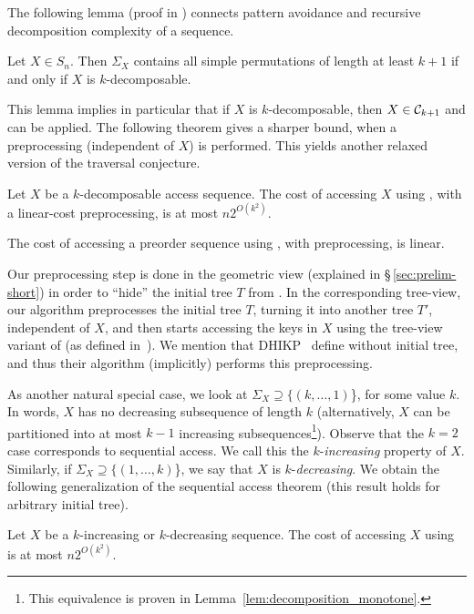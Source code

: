 The following lemma (proof in ) connects pattern avoidance and recursive decomposition complexity of a sequence.

\begin{lemma}
\label{lem:connection}
Let $X \in S_n$. Then $\Sigma_X$ contains all simple permutations of length at least $k+1$ if and only if $X$ is $k$-decomposable. 
\end{lemma}  

This lemma implies in particular that if $X$ is $k$-decomposable, then $X \in {\mathcal{C}}_{k+1}$ and  can be applied. The following theorem gives a sharper bound, when a preprocessing (independent of $X$) is performed. 
This yields another relaxed version of the traversal conjecture. 

\begin{theorem}
\label{thm:main-noinitial}  
Let $X$ be a $k$-decomposable access sequence.  
The cost of accessing $X$ using \greedy, with a linear-cost preprocessing, is at most $n 2^{O(k^2)}$. 
\end{theorem} 

\begin{corollary}
\label{cor:trav2}
The cost of accessing a preorder sequence using \greedy, with preprocessing, is linear. 
\end{corollary}

Our preprocessing step is done in the geometric view (explained in \S\,\ref{sec:prelim-short}) in order to ``hide'' the initial tree $T$ from \greedy. In the corresponding tree-view, our algorithm preprocesses the initial tree $T$, turning it into another tree $T'$, independent of $X$, and then starts accessing the keys in $X$ using the tree-view variant of \greedy (as defined in~\cite{DHIKP09}). We mention that DHIKP~\cite{DHIKP09} define \greedy without initial tree, and thus their algorithm (implicitly) performs this preprocessing.

As another natural special case, we look at $\Sigma_X \supseteq \{(k,\dots,1)$\}, for some value $k$. In words, $X$ has no decreasing subsequence of length $k$ (alternatively, $X$ can be partitioned into at most $k-1$ increasing subsequences\footnote{This equivalence is proven in Lemma~\ref{lem:decomposition_monotone}.}). Observe that the $k=2$ case corresponds to sequential access. 
We call this the $k$-\emph{increasing} property of $X$. Similarly, if $\Sigma_X \supseteq \{(1,\dots,k)$\}, we say that $X$ is $k$-\emph{decreasing}. 
We obtain the following generalization of the sequential access theorem (this result holds for arbitrary initial tree). 
\begin{theorem}
\label{thm:monotone}  
Let $X$ be a $k$-increasing or $k$-decreasing sequence. The cost of accessing $X$ using \greedy is at most $n 2^{O(k^2)}$. 
\end{theorem} 
 
